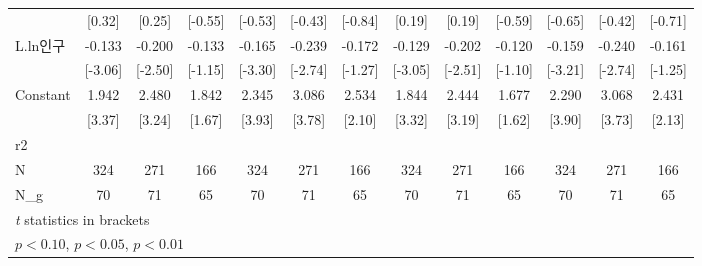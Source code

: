 \begin{tabular}{l*{12}{c}}
                    &      [0.32]         &      [0.25]         &     [-0.55]         &     [-0.53]         &     [-0.43]         &     [-0.84]         &      [0.19]         &      [0.19]         &     [-0.59]         &     [-0.65]         &     [-0.42]         &     [-0.71]         \\
\addlinespace
L.ln인구            &      -0.133\sym{***}&      -0.200\sym{**} &      -0.133         &      -0.165\sym{***}&      -0.239\sym{***}&      -0.172         &      -0.129\sym{***}&      -0.202\sym{**} &      -0.120         &      -0.159\sym{***}&      -0.240\sym{***}&      -0.161         \\
                    &     [-3.06]         &     [-2.50]         &     [-1.15]         &     [-3.30]         &     [-2.74]         &     [-1.27]         &     [-3.05]         &     [-2.51]         &     [-1.10]         &     [-3.21]         &     [-2.74]         &     [-1.25]         \\
\addlinespace
Constant            &       1.942\sym{***}&       2.480\sym{***}&       1.842\sym{*}  &       2.345\sym{***}&       3.086\sym{***}&       2.534\sym{**} &       1.844\sym{***}&       2.444\sym{***}&       1.677         &       2.290\sym{***}&       3.068\sym{***}&       2.431\sym{**} \\
                    &      [3.37]         &      [3.24]         &      [1.67]         &      [3.93]         &      [3.78]         &      [2.10]         &      [3.32]         &      [3.19]         &      [1.62]         &      [3.90]         &      [3.73]         &      [2.13]         \\
\midrule
r2                  &                     &                     &                     &                     &                     &                     &                     &                     &                     &                     &                     &                     \\
N                   &         324         &         271         &         166         &         324         &         271         &         166         &         324         &         271         &         166         &         324         &         271         &         166         \\
N\_g                 &          70         &          71         &          65         &          70         &          71         &          65         &          70         &          71         &          65         &          70         &          71         &          65         \\
\bottomrule
\multicolumn{13}{l}{\footnotesize \textit{t} statistics in brackets}\\
\multicolumn{13}{l}{\footnotesize \sym{*} \(p<0.10\), \sym{**} \(p<0.05\), \sym{***} \(p<0.01\)}\\
\end{tabular}